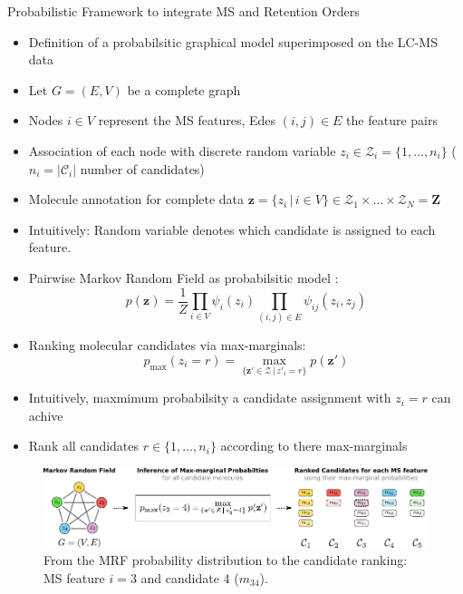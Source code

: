 \documentclass{beamer}
\newcommand{\ms}{MS}
\newcommand{\lc}{LC}
\newcommand{\lcms}{\lc-\ms}
\newcommand{\cands}{\mathcal{C}}
\newcommand{\seqlength}{N}
\begin{document}
\begin{frame}{}
\begin{columns}[T]
    \begin{block}{{\normalsize Probabilistic Framework to integrate \ms{} and Retention Orders}}
    \begin{itemize}
        \item Definition of a probabilsitic graphical model superimposed on the \lcms{} data
        \item Let $G=(E,V)$ be a complete graph
        \item Nodes $i\in V$ represent the \ms{} features, Edes $(i,j)\in E$ the feature pairs
        \item Association of each node with discrete random variable $z_i\in\mathcal{Z}_i=\{1,\ldots,n_i\}$ ($n_i=|\cands_i|$ number of candidates)
        \item Molecule annotation for complete data $\mathbf{z}=\{z_i\,|\,i\in V\}\in\mathcal{Z}_1\times\ldots\times\mathcal{Z}_\seqlength=\mathbf{Z}$
        \item Intuitively: Random variable denotes which candidate is assigned to each feature.
        \item Pairwise Markov Random Field as probabilsitic model \cite{MacKay2005}:
            \begin{equation}
                p(\mathbf{z})=\frac{1}{Z}\prod_{i\in V}\psi_i(z_i)\prod_{(i,j)\in E}\psi_{ij}(z_i,z_j)
            \end{equation}
        \item Ranking molecular candidates via max-marginals:
            \begin{equation}
                p_{\max}(z_i=r)=\underset{\{\mathbf{z}'\in\mathcal{Z}\,|\,z'_i=r\}}{\max}p(\mathbf{z}')
            \end{equation}
        \item Intuitively, maxmimum probabilsity a candidate assignment with $z_i=r$ can achive
        \item Rank all candidates $r\in\{1,\ldots,n_i\}$ according to there max-marginals
    \end{itemize}
    \begin{figure}
        \centering
        \includegraphics[width=\textwidth]{images/mrf_and_ranking.pdf}
        \caption{From the MRF probability distribution to the candidate ranking: \ms{} feature $i=3$ and candidate $4$ ($m_{34}$).}
    \end{figure}
    \end{block}


\end{columns}
\end{frame}
\end{document}
